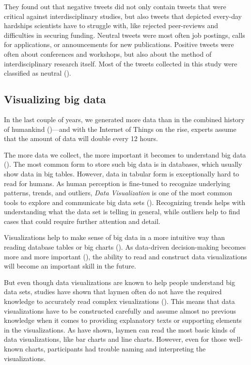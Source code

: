 They found out that negative tweets did not only contain tweets that were critical against interdisciplinary studies, but also tweets that depicted every-day hardships scientists have to struggle with, like rejected peer-reviews and difficulties in securing funding. Neutral tweets were most often job postings, calls for applications, or announcements for new publications. Positive tweets were often about conferences and workshops, but also about the method of interdisciplinary research itself. Most of the tweets collected in this study were classified as neutral (\cite[7]{weberInterdisciplinaryOptimismSentiment2019}).


\subsection{Visualizing big data}
In the last couple of years, we generated more data than in the combined history of humankind (\cite{helbing2019will})---and with the Internet of Things on the rise, experts assume that the amount of data will double every 12 hours.

The more data we collect, the more important it becomes to understand big data (\cite{bornerDataVisualizationLiteracy2019}). The most common form to store such big data is in databases, which usually show data in big tables. However, data in tabular form is exceptionally hard to read for humans. As human perception is fine-tuned to recognize underlying patterns, trends, and outliers, \emph{Data Visualization} is one of the most common tools to explore and communicate big data sets (\cite{heerTourVisualizationZoo2010}). Recognizing trends helps with understanding what the data set is telling in general, while outliers help to find cases that could require further attention and detail.

Visualizations help to make sense of big data in a more intuitive way than reading database tables or big charts (\cite{donalekImmersiveCollaborativeData2014}). As data-driven decision-making becomes more and more important (\cite{brynjolfssonStrengthNumbersHow2011}), the ability to read and construct data visualizations will become an important skill in the future.

But even though data visualizations are known to help people understand big data sets, studies have shown that laymen often do not have the required knowledge to accurately read complex visualizations (\cite{bornerInvestigatingAspectsData2016}). This means that data visualizations have to be constructed carefully and assume almost no previous knowledge when it comes to providing explanatory texts or supporting elements in the visualizations. As \citeauthor{bornerInvestigatingAspectsData2016} have shown, laymen can read the most basic kinds of data visualizations, like bar charts and line charts. However, even for those well-known charts, participants had trouble naming and interpreting the visualizations.

